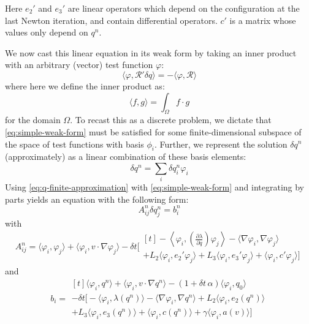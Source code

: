 \documentclass[reqno]{article}
\begin{document}
  Here $e_2'$ and $e_3'$ are linear operators which depend on the configuration
  at the last Newton iteration, and contain differential operators.
  $c'$ is a matrix whose values only depend on $q^n$.

  We now cast this linear equation in its weak form by taking an inner product
  with an arbitrary (vector) test function $\varphi$:
  \begin{equation}\label{eq:simple-weak-form}
    \langle \varphi, \mathcal{R}' \delta q \rangle
    = -\langle \varphi, \mathcal{R} \rangle
  \end{equation}
  where here we define the inner product as:
  \begin{equation} 
    \langle f, g \rangle
    =
    \int_\Omega f \cdot g
  \end{equation}
  for the domain $\Omega$.
  To recast this as a discrete problem, we dictate that
  \eqref{eq:simple-weak-form} must be satisfied for some finite-dimensional
  subspace of the space of test functions with basis $\phi_i$.
  Further, we represent the solution $\delta q^n$ (approximately) as a linear
  combination of these basis elements:
  \begin{equation} \label{eq:q-finite-approximation}
    \delta q^n = \sum_{i} \delta q^n_i \varphi_i
  \end{equation}
  Using \eqref{eq:q-finite-approximation} with \eqref{eq:simple-weak-form} and integrating
  by parts yields an equation with the following form:
  \begin{equation}
    A^n_{ij} \delta q^n_j = b^n_i
  \end{equation}
  with
  \begin{equation}
    A^n_{ij}
    =
    \langle \varphi_i, \varphi_j \rangle
    + \langle \varphi_i, v \cdot \nabla \varphi_j \rangle
    - \delta t \biggl[
    \begin{multlined}[t]
      -\left< \varphi_i, \left( \frac{\partial \lambda}{\partial q} \right) \varphi_j \right>
      - \langle \nabla \varphi_i, \nabla \varphi_j \rangle \\
      + L_2 \langle \varphi_i, e_2' \varphi_j \rangle
      + L_3 \langle \varphi_i, e_3' \varphi_j \rangle
      + \langle \varphi_i, c' \varphi_j \rangle
      \biggr]
    \end{multlined}
  \end{equation}
  and
  \begin{equation}
    b_i
    =
    \begin{multlined}[t]
    \langle \varphi_i, q^n \rangle
    + \langle \varphi_i, v \cdot \nabla q^n \rangle
    - (1 + \delta t \, \alpha) \langle \varphi_i, q_0 \rangle \\
    - \delta t \biggl[
      - \langle \varphi_i, \lambda(q^n) \rangle
      - \langle \nabla \varphi_i, \nabla q^n \rangle
      + L_2 \langle \varphi_i, e_2(q^n) \rangle \\
      + L_3 \langle  \varphi_i, e_3(q^n) \rangle
      + \langle \varphi_i, c(q^n) \rangle
      + \gamma \langle \varphi_i, a(v) \rangle
    \biggr]
    \end{multlined}
  \end{equation}
\end{document}
